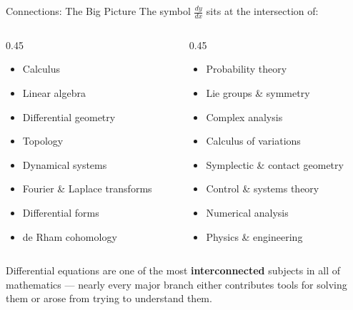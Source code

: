 \begin{frame}{Connections: The Big Picture}
The symbol $\frac{dy}{dx}$ sits at the intersection of:

\vspace{0.2cm}
\begin{columns}[T]
\begin{column}{0.45\textwidth}
\begin{itemize}
    \item Calculus
    \item Linear algebra
    \item Differential geometry
    \item Topology
    \item Dynamical systems
    \item Fourier \& Laplace transforms
    \item Differential forms
    \item de Rham cohomology
\end{itemize}
\end{column}
\begin{column}{0.45\textwidth}
\begin{itemize}
    \item Probability theory
    \item Lie groups \& symmetry
    \item Complex analysis
    \item Calculus of variations
    \item Symplectic \& contact geometry
    \item Control \& systems theory
    \item Numerical analysis
    \item Physics \& engineering
\end{itemize}
\end{column}
\end{columns}

\vspace{0.4cm}

Differential equations are one of the most \textbf{interconnected} subjects in all of mathematics --- nearly every major branch either contributes tools for solving them or arose from trying to understand them.
\end{frame}


